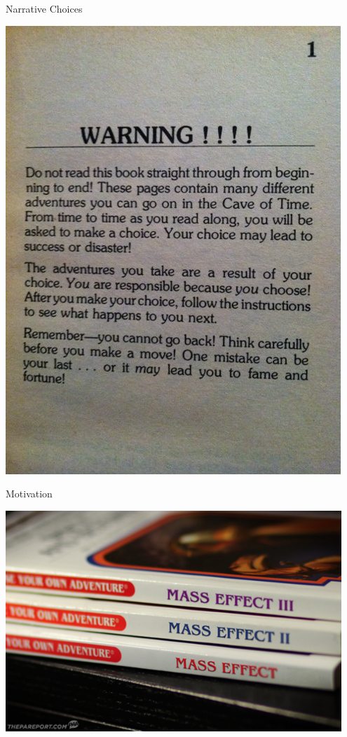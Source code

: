 \documentclass[xcolor=x11names]{beamer}
\begin{document}
\begin{frame}{Narrative Choices}
\begin{center}
  \includegraphics[height=0.8\textheight]{res/cave-of-time-warning.jpg}
\end{center}
\end{frame}

\begin{frame}{Motivation}
\begin{center}
  \includegraphics[width=0.95\textwidth]{res/mass-effect-cyoa.jpg}
\end{center}
\end{frame}
\end{document}
